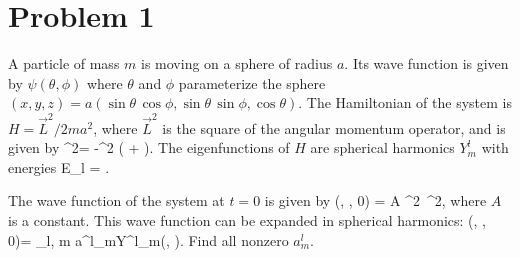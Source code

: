 \newcommand{\tht}{\theta}
\newcommand{\sint}{\sin{\tht}}
\newcommand{\cost}{\cos{\tht}}
\newcommand{\sinwt}{\sin^2{\tht}}
\newcommand{\coswt}{\cos^2{\tht}}
\newcommand{\sinp}{\sin{\phi}}
\newcommand{\cosp}{\cos{\phi}}
\newcommand{\sinwp}{\sin^2{\phi}}
\newcommand{\coswp}{\cos^2{\phi}}

\newcommand{\vL}{\vec{L}}
\newcommand{\vLw}{\vL^2}

\newcommand{\Ylm}{Y^l_m}
\newcommand{\Ylmtp}{\Ylm(\tp)}
\newcommand{\alm}{a^l_m}
\newcommand{\dOmega}{\sint \dd{\tht} \dd{\phi}}

\newcommand{\tp}{\tht, \phi}
\newcommand{\psitpo}{\psi(\tp, 0)}
\newcommand{\psitpt}{\psi(\tp, t)}

\section{Problem 1}
\begin{statement}
	A particle of mass $m$ is moving on a sphere of radius $a$.  Its wave function is given by $\psi(\tp)$ where $\tht$ and $\phi$ parameterize the sphere $(x, y, z) = a(\sint \, \cosp, \sint \, \sinp, \cost)$.  The Hamiltonian of the system is ${H = \vLw / 2 m a^2}$, where $\vLw$ is the square of the angular momentum operator, and is given by
	\beq
		\vLw = -\hbar^2 \left( \frac{1}{\sint} \pdv{}{\tht} \sint \pdv{}{\tht} + \frac{1}{\sinwt} \pdv[2]{}{\phi} \right).
	\eeq
	The eigenfunctions of $H$ are spherical harmonics $\Ylm$ with energies
	\beqn \label{eigene}
		E_l = .
	\eeqn
\vfix
\end{statement}

\begin{problem} \label{1}
	The wave function of the system at $t = 0$ is given by
	\beq
		\psi(\tp, 0) = A \sinwt \, \coswp,
	\eeq
	where $A$ is a constant.  This wave function can be expanded in spherical harmonics:
	\beq
		\psitpo = \sum_{l, m} \alm \Ylmtp.
	\eeq
	Find all nonzero $\alm$.
\end{problem}

